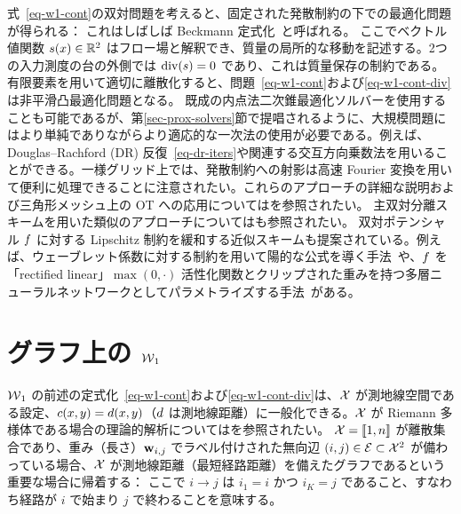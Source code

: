 式~\eqref{eq-w1-cont}の双対問題を考えると、固定された発散制約の下での最適化問題が得られる：
これはしばしば Beckmann 定式化~\citep{Beckmann52}と呼ばれる。
ここでベクトル値関数 $s(x) \in \mathbb{R}^2$ はフロー場と解釈でき、質量の局所的な移動を記述する。2つの入力測度の台の外側では $\operatorname{div}(s)=0$ であり、これは質量保存の制約である。
有限要素を用いて適切に離散化すると、問題~\eqref{eq-w1-cont}および\eqref{eq-w1-cont-div}は非平滑凸最適化問題となる。
既成の内点法二次錐最適化ソルバーを使用することも可能であるが、第\ref{sec-prox-solvers}節で提唱されるように、大規模問題にはより単純でありながらより適応的な一次法の使用が必要である。例えば、Douglas--Rachford (DR) 反復~\eqref{eq-dr-iters}や関連する交互方向乗数法を用いることができる。一様グリッド上では、発散制約への射影は高速 Fourier 変換を用いて便利に処理できることに注意されたい。これらのアプローチの詳細な説明および三角形メッシュ上の OT への応用については\citet{SolomonEMDSurfaces2014}を参照されたい。
主双対分離スキームを用いた類似のアプローチについては\citet{LiRyuOsherYinGangbo2017_parallel,Ryu2017a,Ryu2017b}も参照されたい。
双対ポテンシャル $f$ に対する Lipschitz 制約を緩和する近似スキームも提案されている。例えば、ウェーブレット係数に対する制約を用いて陽的な公式を導く手法~\citep{shirdhonkar2008approximate}や、$f$ を「rectified linear」$\max(0,\cdot)$ 活性化関数とクリップされた重みを持つ多層ニューラルネットワークとしてパラメトライズする手法~\citep{WassersteinGAN}がある。

\section{グラフ上の $\operatorname{\mathcal{W}}_1$}

$\operatorname{\mathcal{W}}_1$ の前述の定式化~\eqref{eq-w1-cont}および\eqref{eq-w1-cont-div}は、$\mathcal{X}$ が測地線空間である設定、\ie $c(x,y)=d(x,y)$（$d$ は測地線距離）に一般化できる。$\mathcal{X}$ が Riemann 多様体である場合の理論的解析については\citet{FeldmanMacCann02}を参照されたい。
$\mathcal{X}=\llbracket1,n\rrbracket$ が離散集合であり、重み（長さ）$\mathrm{\textbf{w}}_{i,j}$ でラベル付けされた無向辺 $(i,j) \in \mathcal{E} \subset \mathcal{X}^2$ が備わっている場合、$\mathcal{X}$ が測地線距離（最短経路距離）を備えたグラフであるという重要な場合に帰着する：
ここで $i \rightarrow j$ は $i_1=i$ かつ $i_K=j$ であること、すなわち経路が $i$ で始まり $j$ で終わることを意味する。

